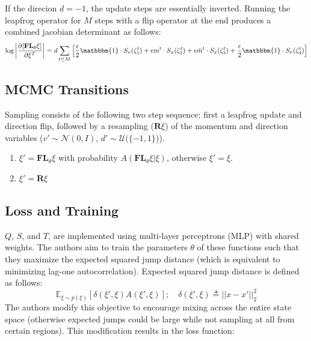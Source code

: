 \documentclass[twoside]{article}
\begin{document}
If the direcion $d=-1$, the update steps are essentially inverted. Running the leapfrog operator for $M$ steps with a flip operator at the end produces a combined jacobian determinant as follows:
\begin{equation}
    \text{log} \left|\frac{\partial[\textbf{FL}_\theta\xi]}{\partial \xi^T}\right| = d \sum_{t\leq M} \left[\frac{\epsilon}{2}\mathbbm{1} \cdot S_v(\zeta_1^t) + \epsilon m^t \cdot S_x(\zeta_2^t) + \epsilon \Bar{m}^t \cdot S_x(\zeta_3^t) + \frac{\epsilon}{2}\mathbbm{1} \cdot S_v(\zeta_4^t)\right]
\end{equation}

\subsection{MCMC Transitions}
Sampling consists of the following two step sequence: first a leapfrog update and direction flip, followed by a resampling ($\textbf{R}\xi$) of the momentum and direction variables ($v' \sim \mathcal{N}(0,I)$, $d' \sim \mathcal{U}(\{-1,1\}$)).
\begin{enumerate}
    \item $\xi' = \textbf{FL}_\theta \xi$ with probability $A(\textbf{FL}_\theta\xi|\xi)$, otherwise $\xi'=\xi$.
    \item $\xi' = \textbf{R}\xi$
\end{enumerate}

\subsection{Loss and Training}
$Q$, $S$, and $T$, are implemented using multi-layer perceptrons (MLP) with shared weights. The authors aim to train the parameters $\theta$ of these functions such that they maximize the expected squared jump distance (which is equivalent to minimizing lag-one autocorrelation)\citep{Pasarica2003}. Expected squared jump distance is defined as follows:
\begin{equation}
    \mathbb{E}_{\xi \sim p(\xi)} [\delta(\xi',\xi)A(\xi',\xi)]; \quad \delta(\xi',\xi) \triangleq ||x-x'||_2^2
\end{equation}
The authors modify this objective to encourage mixing across the entire state space (otherwise expected jumps could be large while not sampling at all from certain regions). This modification results in the loss function:
\end{document}

